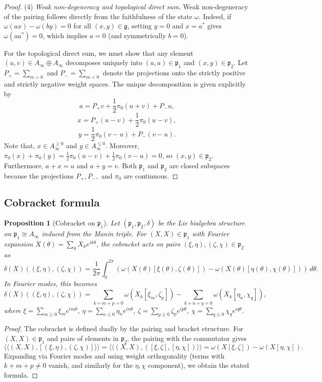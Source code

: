 \documentclass[11pt,reqno]{amsart}
\newtheorem{proposition}[theorem]{Proposition}
\theoremstyle{definition}
\numberwithin{equation}{section}
\begin{document}
\begin{proof}
(4) \textit{Weak non-degeneracy and topological direct sum}. Weak non-degeneracy of the pairing follows directly from the faithfulness of the state $\omega$. Indeed, if $\omega(ax) - \omega(by) = 0$ for all $(x, y) \in \mathfrak{g}$, setting $y=0$ and $x=a^*$ gives $\omega(aa^*) = 0$, which implies $a=0$ (and symmetrically $b=0$). 

For the topological direct sum, we must show that any element $(u, v) \in A_{\infty} \oplus A_{\infty}$ decomposes uniquely into $(a, a) \in \mathfrak{p}_1$ and $(x, y) \in \mathfrak{p}_2$. Let $P_+ = \sum_{m > 0}$ and $P_- = \sum_{m < 0}$ denote the projections onto the strictly positive and strictly negative weight spaces. The unique decomposition is given explicitly by
\[
a = P_+ v + \frac{1}{2}\pi_0(u+v) + P_- u,
\]
\[
x = P_+ (u-v) + \frac{1}{2}\pi_0(u-v),
\]
\[
y = \frac{1}{2}\pi_0(v-u) + P_- (v-u).
\]
Note that, $x \in A_{\infty}^{\ge 0}$ and $y \in A_{\infty}^{\le 0}$. Moreover, $\pi_0(x) + \pi_0(y) = \frac{1}{2}\pi_0(u-v) + \frac{1}{2}\pi_0(v-u) = 0$, so $(x,y) \in \mathfrak{p}_2$. Furthermore, $a + x = u$ and $a + y = v$. Both $\mathfrak{p}_1$ and $\mathfrak{p}_2$ are closed subspaces because the projections $P_+, P_-,$ and $\pi_0$ are continuous.
\end{proof}

\subsection{Cobracket formula}
\begin{proposition}[Cobracket on $\mathfrak{p}_1$]
Let $(\mathfrak{p}_1, \mathfrak{p}_2, \delta)$ be the Lie bialgebra structure on $\mathfrak{p}_1 \cong A_{\infty}$ induced from the Manin triple. For $(X, X) \in \mathfrak{p}_1$ with Fourier expansion $X(\theta) = \sum_k X_k e^{ik\theta}$, the cobracket acts on pairs $(\xi, \eta), (\zeta, \chi) \in \mathfrak{p}_2$ as
\[
\delta(X)((\xi, \eta), (\zeta, \chi)) = \frac{1}{2\pi} \int_0^{2\pi} \left( \omega(X(\theta)[\xi(\theta), \zeta(\theta)]) - \omega(X(\theta)[\eta(\theta), \chi(\theta)]) \right) \, d\theta.
\]
In Fourier modes, this becomes
\[
\delta(X)((\xi, \eta), (\zeta, \chi)) = \sum_{k+m+p=0} \omega(X_k[\xi_m, \zeta_p]) - \sum_{k+n+q=0} \omega(X_k[\eta_n, \chi_q]),
\]
where $\xi = \sum_{m \ge 0} \xi_m e^{im\theta}$, $\eta = \sum_{n \le 0} \eta_n e^{in\theta}$, $\zeta = \sum_{p \ge 0} \zeta_p e^{ip\theta}$, $\chi = \sum_{q \le 0} \chi_q e^{iq\theta}$.
\end{proposition}

\begin{proof}
The cobracket is defined dually by the pairing and bracket structure. For $(X, X) \in \mathfrak{p}_1$ and pairs of elements in $\mathfrak{p}_2$, the pairing with the commutator gives
\[
\langle\langle (X, X), [(\xi, \eta), (\zeta, \chi)] \rangle\rangle = \langle\langle (X, X), ([\xi, \zeta], [\eta, \chi]) \rangle\rangle = \omega(X[\xi, \zeta]) - \omega(X[\eta, \chi]).
\]
Expanding via Fourier modes and using weight orthogonality (terms with $k+m+p \neq 0$ vanish, and similarly for the $\eta, \chi$ component), we obtain the stated formula.
\end{proof}
\end{document}
